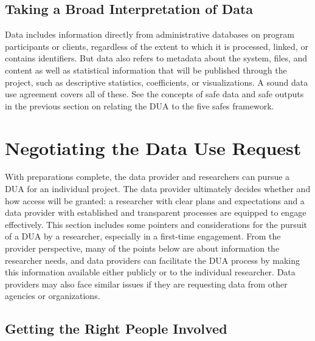 \hypertarget{taking-a-broad-interpretation-of-data}{%
\subsection{Taking a Broad Interpretation of Data}\label{taking-a-broad-interpretation-of-data}}

Data includes information directly from administrative databases on program participants or clients, regardless of the extent to which it is processed, linked, or contains identifiers. But data also refers to metadata about the system, files, and content as well as statistical information that will be published through the project, such as descriptive statistics, coefficients, or visualizations. A sound data use agreement covers all of these. See the concepts of safe data and safe outputs in the previous section on relating the DUA to the five safes framework.

\hypertarget{negotiating-the-data-use-request}{%
\section{Negotiating the Data Use Request}\label{negotiating-the-data-use-request}}

With preparations complete, the data provider and researchers can pursue a DUA for an individual project. The data provider ultimately decides whether and how access will be granted: a researcher with clear plans and expectations and a data provider with established and transparent processes are equipped to engage effectively. This section includes some pointers and considerations for the pursuit of a DUA by a researcher, especially in a first-time engagement. From the provider perspective, many of the points below are about information the researcher needs, and data providers can facilitate the DUA process by making this information available either publicly or to the individual researcher. Data providers may also face similar issues if they are requesting data from other agencies or organizations.

\hypertarget{getting-the-right-people-involved}{%
\subsection{Getting the Right People Involved}\label{getting-the-right-people-involved}}

